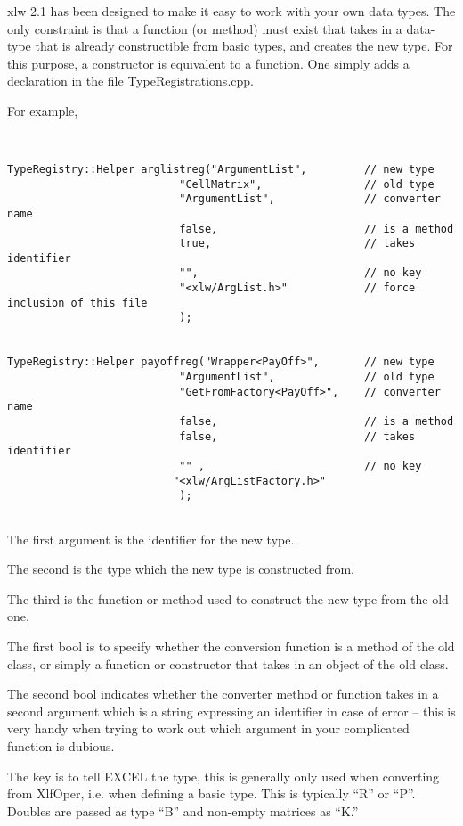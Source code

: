 \documentclass[12pt,reqno]{amsart}
\numberwithin{equation}{section}
\numberwithin{figure}{section}
\begin{document}
xlw 2.1 has been designed to make it easy to work with your own data
types. The only constraint is that a function (or method) must exist
that takes in a data-type that is already constructible from basic
types, and creates the new type. For this purpose, a constructor is
equivalent to a function. One simply adds a declaration in the file
TypeRegistrations.cpp. 

For example,
\begin{verbatim}


TypeRegistry::Helper arglistreg("ArgumentList",         // new type
                           "CellMatrix",                // old type
                           "ArgumentList",              // converter name
                           false,                       // is a method
                           true,                        // takes identifier 
                           "",                          // no key
                           "<xlw/ArgList.h>"            // force inclusion of this file
                           );


TypeRegistry::Helper payoffreg("Wrapper<PayOff>",       // new type
                           "ArgumentList",              // old type
                           "GetFromFactory<PayOff>",    // converter name
                           false,                       // is a method
                           false,                       // takes identifier 
                           "" ,                         // no key
                          "<xlw/ArgListFactory.h>"
                           );


\end{verbatim}

The first argument is the identifier for the new type.

The second is the type which the new type is constructed from. 

The third is the function or method used to construct the new type
from the old one. 

The first bool is to specify whether the conversion function is a
method of the old class, or simply a function or constructor that
takes in an object of the old class. 

The second bool indicates whether the converter method or function
takes in a second argument which is a string expressing an identifier
in case of error -- this is very handy when trying to work out which
argument in your complicated function is dubious. 

The key is to tell EXCEL the type, this is generally only used when converting
from XlfOper, i.e. when defining a basic type. This is typically ``R''
or ``P''. Doubles are passed as type ``B'' and non-empty matrices as ``K.''
\end{document}
